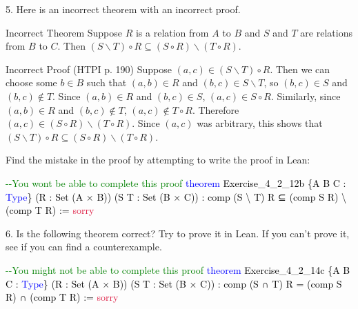 \documentclass[
  letterpaper,
  DIV=11,
  numbers=noendperiod]{scrreprt}
\newenvironment{Shaded}{\begin{snugshade}}{\end{snugshade}}
\newcommand{\CommentTok}[1]{\textcolor[rgb]{0.37,0.37,0.37}{#1}}
\newcommand{\ConstantTok}[1]{\textcolor[rgb]{0.56,0.35,0.01}{#1}}
\newcommand{\KeywordTok}[1]{\textcolor[rgb]{0.00,0.23,0.31}{#1}}
\newcommand{\NormalTok}[1]{\textcolor[rgb]{0.00,0.23,0.31}{#1}}
\renewcommand{\NormalTok}[1]{\textcolor[HTML]{000000}{#1}}
\renewcommand{\KeywordTok}[1]{\textcolor[HTML]{0000FF}{#1}}
\renewcommand{\CommentTok}[1]{\textcolor[HTML]{008000}{#1}}
\renewcommand{\ConstantTok}[1]{\textcolor[HTML]{DC143C}{#1}}
\newcommand{\excl}[1]{}
\newcommand{\setmin}{\mathbin{\backslash}}
\theoremstyle{remark}
\begin{document}
5. Here is an incorrect theorem with an incorrect proof.

\begin{nthm}{Incorrect Theorem}
Suppose \(R\) is a relation from \(A\) to \(B\) and \(S\) and \(T\) are
relations from \(B\) to \(C\). Then
\((S \setmin T) \circ R \subseteq (S \circ R) \setmin (T \circ R)\).

\end{nthm}

\begin{npf}{Incorrect Proof (HTPI p. 190)}
Suppose \((a, c) \in (S \setmin T) \circ R\). Then we can choose some
\(b \in B\) such that \((a, b) \in R\) and \((b, c) \in S \setmin T\),
so \((b, c) \in S\) and \((b, c) \notin T\). Since \((a, b) \in R\) and
\((b, c) \in S\), \((a, c) \in S \circ R\). Similarly, since
\((a, b) \in R\) and \((b, c) \notin T\), \((a, c) \notin T \circ R\).
Therefore \((a, c) \in (S \circ R) \setmin (T \circ R)\). Since
\((a, c)\) was arbitrary, this shows that
\((S \setmin T) \circ R \subseteq (S \circ R) \setmin (T \circ R)\).
\excl{~□}\qedhere

\end{npf}

Find the mistake in the proof by attempting to write the proof in Lean:

\begin{Shaded}
\begin{Highlighting}[]
\CommentTok{{-}{-}You won\textquotesingle{}t be able to complete this proof}
\KeywordTok{theorem}\NormalTok{ Exercise\_4\_2\_12b \{A B C : }\KeywordTok{Type}\NormalTok{\}}
\NormalTok{    (R : Set (A × B)) (S T : Set (B × C)) :}
\NormalTok{    comp (S \textbackslash{} T) R ⊆ (comp S R) \textbackslash{} (comp T R) := }\ConstantTok{sorry}
\end{Highlighting}
\end{Shaded}

6. Is the following theorem correct? Try to prove it in Lean. If you
can't prove it, see if you can find a counterexample.

\begin{Shaded}
\begin{Highlighting}[]
\CommentTok{{-}{-}You might not be able to complete this proof}
\KeywordTok{theorem}\NormalTok{ Exercise\_4\_2\_14c \{A B C : }\KeywordTok{Type}\NormalTok{\}}
\NormalTok{    (R : Set (A × B)) (S T : Set (B × C)) :}
\NormalTok{    comp (S ∩ T) R = (comp S R) ∩ (comp T R) := }\ConstantTok{sorry}
\end{Highlighting}
\end{Shaded}
\end{document}
